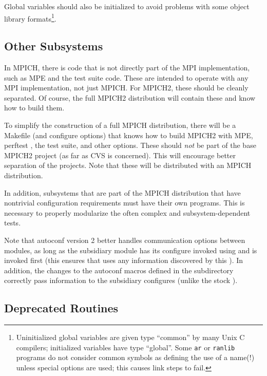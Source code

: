 \documentclass{article}
\begin{document}
\begin{description}
Global variables should also be initialized to avoid problems with
some object library formats\footnote{Uninitialized global variables
are given type ``common'' by many Unix C compilers; initialized
variables have type ``global''.  Some \texttt{ar} or \texttt{ranlib}
programs do not consider common symbols as defining the use of a name(!)
unless special options are used; this causes link steps to fail.}. 

\end{description}

\subsection{Other Subsystems}
In MPICH, there is code that is not directly part of the MPI
implementation, such as MPE and the test suite code.  These are intended to
operate with any MPI implementation, not just MPICH.
For MPICH2, these should be cleanly separated.  Of course, the full MPICH2
distribution will contain these and know how to build them.

To simplify the construction of a
full MPICH distribution, there will be a Makefile (and configure
options) that knows how to build MPICH2 with MPE, perftest
\cite{mpptest}, the test 
suite, and other options.  These should \emph{not} be part of the base
MPICH2 project (as far as CVS is concerned).  This will encourage
better separation of the projects.  Note that these will be distributed with
an MPICH distribution.  

In addition, subsystems that are part of the MPICH distribution that have
nontrivial configuration requirements must have their own 
programs.  This is necessary to properly modularize the often complex and
subsystem-dependent tests.

Note that autoconf version 2 better handles communication options between
modules, as long as the subsidiary module has its configure invoked using
 and  is invoked first
(this ensures that  uses any information
discovered by this ).  In addition, the changes to the autoconf
macros defined in the  subdirectory correctly pass
information to the subsidiary configures (unlike the stock
).

\subsection{Deprecated Routines}
\end{document}
